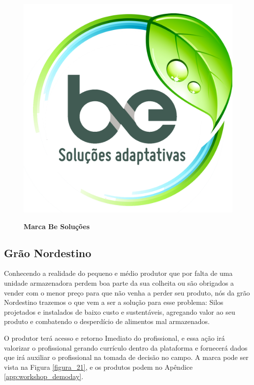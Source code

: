 \begin{figure}[H]
\centering
\caption{\textbf{Marca Be Soluções}}
\includegraphics[scale=0.5]{Imagens/besolucoes.png}
\label{figura_20}
\end{figure}

\subsection{Grão Nordestino}

Conhecendo a realidade do pequeno e médio produtor que por falta de uma unidade armazenadora perdem boa parte da sua colheita ou são obrigados a vender com o menor preço para que não venha a perder seu produto, nós da grão Nordestino trazemos o que vem a ser a solução para esse problema: Silos projetados e instalados de baixo custo e sustentáveis, agregando valor ao seu produto e combatendo o desperdício de alimentos mal armazenados.

O produtor terá acesso e retorno Imediato do profissional, e essa ação irá valorizar o profissional gerando currículo dentro da plataforma e fornecerá dados que irá auxiliar o profissional na tomada de decisão no campo. A marca pode ser vista na Figura \ref{figura_21}, e os produtos podem no Apêndice \ref{app:workshop_demoday}.


